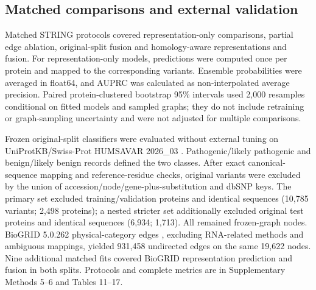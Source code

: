 \documentclass[conference]{IEEEtran}
\begin{document}
\subsection{Matched comparisons and external validation}

Matched STRING protocols covered representation-only comparisons, partial edge ablation, original-split fusion and homology-aware representations and fusion. For representation-only models, predictions were computed once per protein and mapped to the corresponding variants. Ensemble probabilities were averaged in float64, and AUPRC was calculated as non-interpolated average precision. Paired protein-clustered bootstrap 95\% intervals used 2,000 resamples conditional on fitted models and sampled graphs; they do not include retraining or graph-sampling uncertainty and were not adjusted for multiple comparisons.

Frozen original-split classifiers were evaluated without external tuning on UniProtKB/\allowbreak{}Swiss-Prot HUMSAVAR 2026\_03 \cite{UniProt2025}. Pathogenic/likely pathogenic and benign/likely benign records defined the two classes. After exact canonical-sequence mapping and reference-residue checks, original variants were excluded by the union of accession/node/gene-plus-substitution and dbSNP keys. The primary set excluded training/validation proteins and identical sequences (10,785 variants; 2,498 proteins); a nested stricter set additionally excluded original test proteins and identical sequences (6,934; 1,713). All remained frozen-graph nodes. BioGRID 5.0.262 physical-category edges \cite{Stark2006BioGRID}, excluding RNA-related methods and ambiguous mappings, yielded 931,458 undirected edges on the same 19,622 nodes. Nine additional matched fits covered BioGRID representation prediction and fusion in both splits. Protocols and complete metrics are in Supplementary Methods 5--6 and Tables 11--17.
\end{document}
